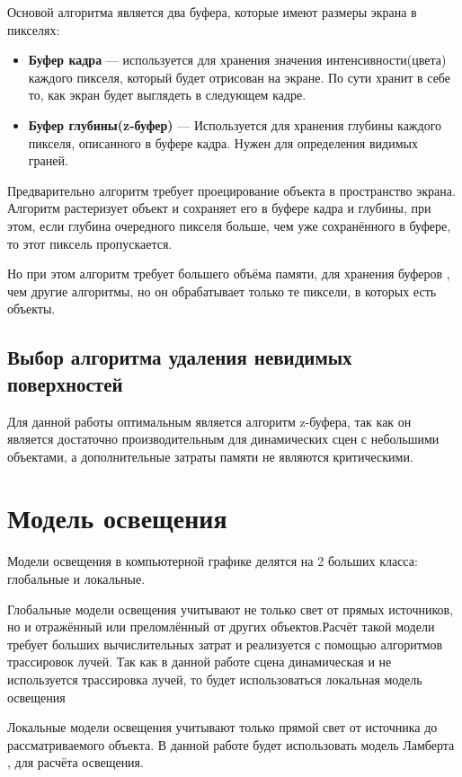 Основой алгоритма является два буфера, которые имеют размеры экрана в пикселях:

\begin{itemize}
	\item \textbf{Буфер кадра} — используется для хранения значения интенсивности(цвета) каждого пикселя, который будет отрисован на экране. По сути хранит в себе то, как экран будет выглядеть в следующем кадре.
	\item \textbf{Буфер глубины(z-буфер)} — Используется для хранения глубины каждого пикселя, описанного в буфере кадра. Нужен для определения видимых граней.
\end{itemize}

Предварительно алгоритм требует проецирование объекта в пространство экрана. Алгоритм растеризует объект и сохраняет его в буфере кадра и глубины, при этом, если глубина очередного пикселя больше, чем уже сохранённого в буфере, то этот пиксель пропускается.

 Но при этом алгоритм требует большего объёма памяти, для хранения буферов \cite{rodgers}, чем другие алгоритмы, но он обрабатывает только те пиксели, в которых есть объекты.

\subsection{Выбор алгоритма удаления невидимых поверхностей}

Для данной работы оптимальным является алгоритм z-буфера, так как он является достаточно производительным для динамических сцен с небольшими объектами, а дополнительные затраты памяти не являются критическими.


\section{Модель освещения}
Модели освещения в компьютерной графике делятся на 2 больших класса: глобальные и локальные.

Глобальные модели освещения учитывают не только свет от прямых источников, но и отражённый или преломлённый от других объектов.Расчёт такой модели требует больших вычислительных затрат и реализуется с помощью алгоритмов трассировок лучей. Так как в данной работе сцена динамическая и не используется трассировка лучей, то будет использоваться локальная модель освещения

Локальные модели освещения учитывают только прямой свет от источника до рассматриваемого объекта. В данной работе будет использовать модель Ламберта \cite{rodgers}, для расчёта освещения.

